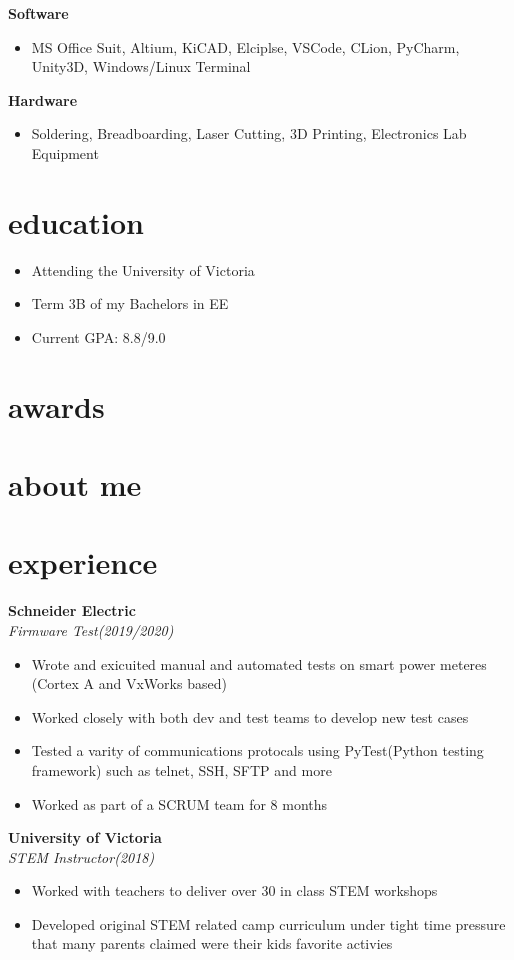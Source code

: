 \documentclass{article}
\newcommand{\minicolumns}[2]{
  \begin{minipage}[t]{0.25\textwidth}
    \begin{flushright}
      #1
    \end{flushright}
  \end{minipage}
  \hfill    
  \begin{minipage}[t]{0.7\textwidth}
    #2
  \end{minipage}   
}
\newcommand{\resumeSection}[3]{
  \minicolumns{
      \textbf{#1}\\          
      \textit{#2}
    }
    {  
      \begin{itemize}[leftmargin=*]
          \setlength\itemsep{-0.1em}
          #3
      \end{itemize}
  }
  \vspace{1em}
}
\begin{document}
\begin{minipage}[t]{0.65\textwidth}
  \resumeSection{Software}{}{
    \item MS Office Suit, Altium, KiCAD, Elciplse, VSCode, CLion, PyCharm, Unity3D, Windows/Linux Terminal
  }

  \resumeSection{Hardware}{}{
    \item Soldering, Breadboarding, Laser Cutting, 3D Printing, Electronics Lab Equipment
  }

\end{minipage}
\begin{minipage}[t]{0.34\textwidth}
  \section{education}
  \begin{itemize}
    \setlength\itemsep{-0.1em}
    \item Attending the University of Victoria
    \item Term 3B of my Bachelors in EE
    \item Current GPA: 8.8/9.0
  \end{itemize}

  \section{awards}
  \section{about me}
\end{minipage}

\section{experience}
\resumeSection{Schneider Electric}{Firmware Test(2019/2020)}{
  \item Wrote and exicuited manual and automated tests on smart power meteres (Cortex A and VxWorks based)
  \item Worked closely with both dev and test teams to develop new test cases
  \item Tested a varity of communications protocals using PyTest(Python testing framework) such as telnet, SSH, SFTP and more
  \item Worked as part of a SCRUM team for 8 months
}

\resumeSection{University of Victoria}{STEM Instructor(2018)}{
  \item Worked with teachers to deliver over 30 in class STEM workshops
  \item Developed original STEM related camp curriculum under tight time pressure 
  that many parents claimed were their kids favorite activies
}
\end{document}
